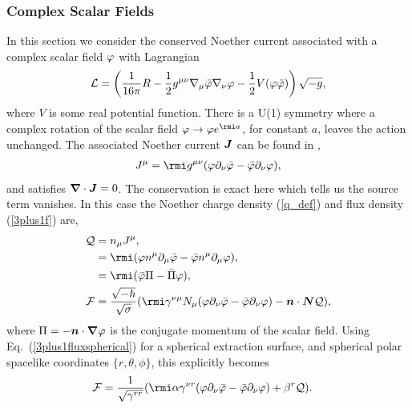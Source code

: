 \subsubsection{Complex Scalar Fields} \label{sect:noether1}
In this section we consider the conserved Noether current associated with a complex scalar field $\varphi$ with Lagrangian
\begin{equation}
\label{csfl}\mathcal{L} = \left(\frac{1}{16 \pi }R -\frac{1}{2}g^{\mu\nu}\nabla_\mu \bar{\varphi} \nabla_\nu \varphi - \frac{1}{2}V(\varphi \bar{\varphi}) \right)\sqrt{-g},
\end{equation}
where $V$ is some real potential function. There is a U(1) symmetry where a complex rotation of the scalar field $\vp \rightarrow \vp e^{\rmi a}$, for constant $a$, leaves the action unchanged. The associated Noether current $\boldsymbol{J}$ can be found in \cite{liebling2017dynamical}, 
\begin{align}
J^\mu = \rmi g^{\mu\nu}(\vp\partial_\nu \bar\vp - \bar\vp\partial_\nu \vp),
\end{align}
and satisfies $\boldsymbol{\nabla}\cdot\boldsymbol{J} = 0$. The conservation is exact here which tells us the source term vanishes. In this case the Noether charge density (\ref{q_def}) and flux density (\ref{3plus1f}) are,
\begin{align}
\mathcal{Q}&= n_\mu J^\mu, \\
           &= \rmi (\vp n^\mu\partial_\mu \bar\vp - \bar\vp n^\mu\partial_\mu \vp), \\
           & = \rmi(\bar\vp \Pi - \bar\Pi \vp), \\
\mathcal{F} &= \frac{\sqrt{-h}}{\sqrt{\sigma}}(\rmi\gamma^{\nu \mu}N_\mu (\vp \partial_\nu \bar\vp - \bar\vp \partial_\nu \vp) - \bs{n} \cdot \bs{N}  \mathcal{Q}),
\end{align}
where $\Pi = -\boldsymbol{n} \cdot\boldsymbol{\nabla}\varphi$ is the conjugate momentum of the scalar field. Using Eq.~(\ref{3plus1fluxspherical}) for a spherical extraction surface, and spherical polar spacelike coordinates $\{r,\theta,\phi\}$, this explicitly becomes
\begin{align}
\mathcal{F} &= \frac{1}{\sqrt{\gamma^{rr}}}(\rmi\alpha\gamma^{\nu r} (\vp \partial_\nu \bar\vp - \bar\vp \partial_\nu \vp) + {\beta^r} \mathcal{Q}).
       \end{align}




